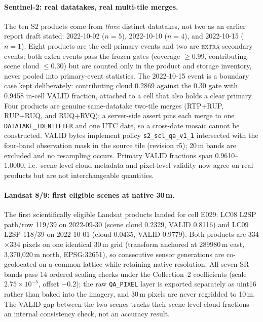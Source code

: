 \paragraph{Sentinel-2: real datatakes, real multi-tile merges.}
The ten S2 products come from \emph{three} distinct datatakes, not two
as an earlier report draft stated: 2022-10-02 ($n=5$), 2022-10-10
($n=4$), and 2022-10-15 ($n=1$). Eight products are the cell primary
events and two are \textsc{extra} secondary events; both extra events
pass the frozen gates (coverage $\ge$0.99, contributing-scene cloud
$\le$0.30) but are counted only in the product and storage inventory,
never pooled into primary-event statistics. The 2022-10-15 event is a
boundary case kept deliberately: contributing cloud 0.2869 against the
0.30 gate with 0.9458 in-cell VALID fraction, attached to a cell that
also holds a clear primary. Four products are genuine same-datatake
two-tile merges (RTP+RUP, RUP+RUQ, and RUQ+RVQ); a server-side assert
pins each merge to one \texttt{DATATAKE\_IDENTIFIER} and one UTC date,
so a cross-date mosaic cannot be constructed. VALID bytes implement
policy \texttt{s2\_scl\_qa\_v1\_1} intersected with the four-band
observation mask in the source tile (revision r5); 20\,m bands are
excluded and no resampling occurs. Primary VALID fractions span
0.9610--1.0000, i.e.\ scene-level cloud metadata and pixel-level
validity now agree on real products but are not interchangeable
quantities.

\paragraph{Landsat 8/9: first eligible scenes at native 30\,m.}
The first scientifically eligible Landsat products landed for cell
E029: LC08 L2SP path/row 119/39 on 2022-09-30 (scene cloud 0.2329,
VALID 0.8116) and LC09 L2SP 118/39 on 2022-10-01 (cloud 0.0435, VALID
0.9779). Both products are 334$\times$334 pixels on one identical
30\,m grid (transform anchored at 289980\,m east, 3{,}370{,}020\,m
north, EPSG:32651), so consecutive sensor generations are
co-geolocated on a common lattice while retaining native resolution.
All seven SR bands pass 14 ordered scaling checks under the
Collection~2 coefficients (scale $2.75\times10^{-5}$, offset $-0.2$);
the raw \texttt{QA\_PIXEL} layer is exported separately as uint16
rather than baked into the imagery, and 30\,m pixels are never
regridded to 10\,m. The VALID gap between the two scenes tracks their
scene-level cloud fractions---an internal consistency check, not an
accuracy result.

